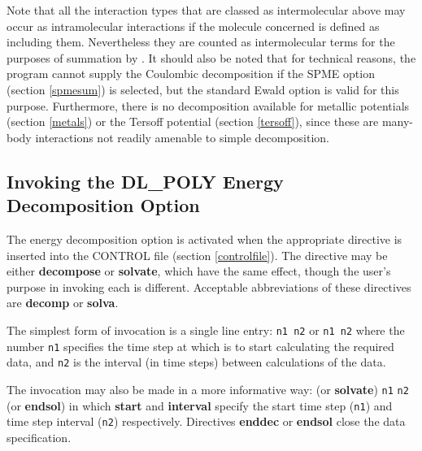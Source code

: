 Note that all the interaction types that are classed as intermolecular above
may occur as intramolecular interactions if the molecule concerned is defined
as including them. Nevertheless they are counted as intermolecular terms for
the purposes of summation by \D{}.  It should also be noted that for technical
reasons, the program cannot supply the Coulombic decomposition if the SPME
option (section \ref{spmesum}) is selected, but the standard Ewald option is
valid for this purpose.  Furthermore, there is no decomposition available for
metallic potentials (section \ref{metals}) or the Tersoff potential (section
\ref{tersoff}), since these are many-body interactions not readily amenable to
simple decomposition.

\subsection{Invoking the DL\_POLY Energy Decomposition Option}

The energy decomposition option is activated when the appropriate directive is
inserted into the CONTROL file (section \ref{controlfile}). The directive
may be either {\bf decompose} or {\bf solvate}, which have the same effect,
though the user's purpose in invoking each is different. Acceptable
abbreviations of these directives are {\bf decomp} or {\bf solva}.

The simplest form of invocation is a single line entry:\newline
\newline
{} {\tt n1 n2}\newline
\noindent or \newline
{} {\tt n1 n2}\newline
\newline
where the number {\tt n1} specifies the time step at which \D{}  is to start
calculating the required data, and {\tt n2} is the interval (in time steps)
between calculations of the data.

The invocation may also be made in a more informative way:\newline
\newline
{}  (or {\bf solvate}) \newline
{} {\tt n1} \newline
{} {\tt n2} \newline
{} (or {\bf endsol})\newline
\newline
in which {\bf start} and {\bf interval} specify the start time step ({\tt n1})
and time step interval ({\tt n2}) respectively. Directives {\bf enddec} or {\bf
endsol} close the data specification.

